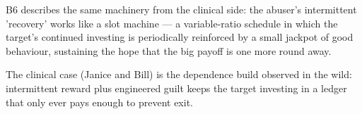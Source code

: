 

\begin{distilled}
  \item B6 describes the same machinery from the clinical side: the abuser's intermittent 'recovery' works like a slot machine --- a variable-ratio schedule in which the target's continued investing is periodically reinforced by a small jackpot of good behaviour, sustaining the hope that the big payoff is one more round away.
  \item The clinical case (Janice and Bill) is the dependence build observed in the wild: intermittent reward plus engineered guilt keeps the target investing in a ledger that only ever pays enough to prevent exit.
\end{distilled}
